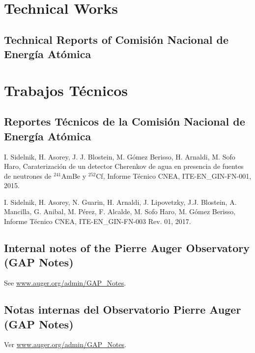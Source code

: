 \ifeng
\section*{Technical Works}
\subsection*{Technical Reports of Comisión Nacional de Energía Atómica}
\else
\section*{Trabajos Técnicos}
\subsection*{Reportes Técnicos de la Comisión Nacional de Energía Atómica}
\fi

\noindent
\begin{etaremune}
\item {} I. Sidelnik, H. Asorey, J. J. Blostein, M. Gómez Berisso, H. Arnaldi, M. Sofo Haro, {{Caraterización de un detector Cherenkov de agua en presencia de fuentes de neutrones de $^{241}$AmBe y $^{252}$Cf}}, Informe Técnico CNEA, ITE-EN\_GIN-FN-001, 2015.

\item {} I. Sidelnik, H. Asorey, N. Guarin, H. Arnaldi, J. Lipovetzky, J.J. Blostein, A. Mancilla, G. Anibal, M. Pérez, F. Alcalde, M. Sofo Haro, M. Gómez Berisso, Informe Técnico CNEA, ITE-EN\_GIN-FN-003 Rev. 01, 2017.

\end{etaremune}

\ifeng
\subsection*{Internal notes of the Pierre Auger Observatory (GAP Notes)}

See \href{http://www.auger.org/admin-cgi-bin/woda/gap\_notes.pl/Search?search=asorey}{www.auger.org/admin/GAP\_Notes}.
\else
\subsection*{Notas internas del Observatorio Pierre Auger (GAP Notes)}

Ver \href{http://www.auger.org/admin-cgi-bin/woda/gap\_notes.pl/Search?search=asorey}{www.auger.org/admin/GAP\_Notes}.
\fi

